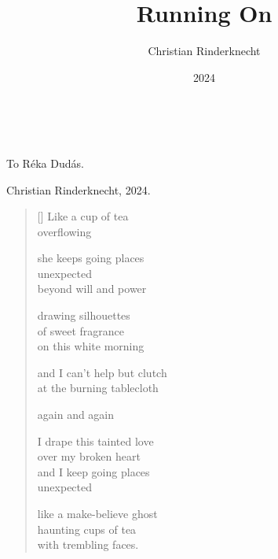 \documentclass[14pt]{extbook}
\title{Running On}
\author{Christian Rinderknecht}
\date{\small 2024}
\newcommand{\clearemptydoublepage}{\newpage{\pagestyle{empty}\cleardoublepage}}
\newcommand*{\centeredornament}{\centerline{\pgfornament[width=6cm]{88}}}
\begin{document}


\thispagestyle{empty}

\maketitle

\thispagestyle{empty} \ \clearemptydoublepage

\vspace*{4cm}

\begin{flushright}
To Réka Dudás.
\end{flushright}

\vspace*{8cm}

\begin{flushright}
  \textcopyright{} Christian Rinderknecht, 2024.
\end{flushright}

\thispagestyle{empty}



\newpage\leavevmode\thispagestyle{empty}\newpage



\newpage

\vspace*{-15mm}
\centeredornament
\vspace*{-7mm}


\settowidth{\versewidth}{Like a make-believe ghost}

\begin{verse}[\versewidth]
  Like a cup of tea \\
  overflowing

  she keeps going places \\
  unexpected \\
  beyond will and power

  drawing silhouettes \\
  of sweet fragrance \\
  on this white morning

  and I can't help but clutch \\
  at the burning tablecloth

  again and again

  I drape this tainted love \\
  over my broken heart \\
  and I keep going places \\
  unexpected

  like a make-believe ghost \\
  haunting cups of tea \\
  with trembling faces.
\end{verse}
\end{document}
